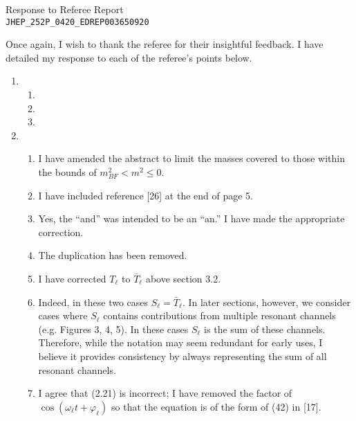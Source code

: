 \documentclass[11pt,letterpaper]{article}
\begin{document}
\vspace{.2in}
\begin{center}
    {\Large Response to Referee Report \\ \verb+JHEP_252P_0420_EDREP003650920+}  
\end{center}

\vspace{.25in}

Once again, I wish to thank the referee for their insightful feedback. I have detailed my response to each of the referee's points below.

\begin{enumerate}
    \item %
    \begin{enumerate}
        \item 
        \item 
        \item
    \end{enumerate}
    \item %
    \begin{enumerate}
        \item I have amended the abstract to limit the masses covered to those within the bounds of $m^2_{BF} < m^2 \leq 0$.
        \item I have included reference [26] at the end of page 5. 
        \item Yes, the ``and'' was intended to be an ``an.'' I have made the appropriate correction.
        \item The duplication has been removed.
        \item I have corrected $T_\ell$ to $\overline{T}_\ell$ above section 3.2.
        \item Indeed, in these two cases $S_\ell = \overline{T}_\ell$.  In later sections, however, we consider cases where $S_\ell$ contains contributions from multiple resonant channels (e.g. Figures 3, 4, 5). In these cases $S_\ell$ is the sum of these channels. Therefore, while the notation may seem redundant for early uses, I believe it provides consistency by always representing the sum of all resonant channels. 
        \item I agree that (2.21) is incorrect; I have removed the factor of $\cos (\omega_\ell t + \varphi_\ell)$ so that the equation is of the form of (42) in [17]. 
    \end{enumerate} 
\end{enumerate}
\end{document}
